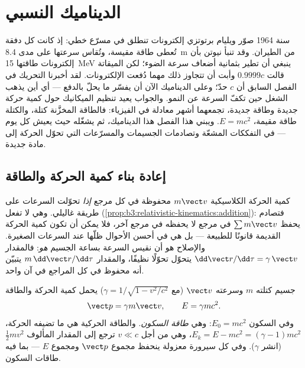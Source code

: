 \chapter{الديناميك النسبي}\label{ch:b3:relativistic-dynamics}

سنة 1964 صوّر ويليام برتوتزي إلكترونات تنطلق في مسرّع خطي: إذ
كانت كل دفقة تُعطى طاقة مقيسة، وتُقاس سرعتها على مدى \qty{8.4}{m}
من الطيران. وقد تنبأ نيوتن بأن إلكترونات طاقتها \qty{15}{MeV}
ينبغي أن تطير بثمانية أضعاف سرعة الضوء؛ لكن الميقاتة قالت
$0.9999c$ وأبت أن تتجاوز ذلك مهما دُفعت الإلكترونات. لقد أخبرنا
التحريك في الفصل السابق أن $c$ حدّ؛ وعلى الديناميك الآن أن يفسّر
ما يحلّ بالدفع --- أي أين يذهب الشغل حين تكفّ السرعة عن النمو.
والجواب يعيد تنظيم الميكانيك حول كمية حركة جديدة وطاقة جديدة،
تجمعهما أشهر معادلة في الفيزياء: فالطاقة المخزَّنة كتلة، والكتلة
طاقة مقيمة، $E = mc^2$. ويبني هذا الفصل هذا الديناميك، ثم يشغّله
حيث يعيش كل يوم --- في التفككات المشعّة وتصادمات الجسيمات
والمسرّعات التي تحوّل الحركة إلى مادة جديدة.

\section{إعادة بناء كمية الحركة والطاقة}

\begin{remark}\label{rem:b3:relativistic-dynamics:why}
كمية الحركة الكلاسيكية $m\vect v$ محفوظة في كل مرجع \emph{إذا}
تحوّلت السرعات على طريقة غاليلي. وهي لا تفعل
(\cref{prop:b3:relativistic-kinematics:addition}): فتصادم يحفظ
$\sum m\vect v$ في مرجع لا يحفظه في مرجع آخر، فلا يمكن أن تكون
كمية الحركة القديمة قانونًا للطبيعة --- بل هي في أحسن الأحوال
ظلّها عند السرعات الصغيرة. والإصلاح هو أن نقيس السرعة بساعة
الجسيم \emph{هو}: فالمقدار $\dd\vect r/\dd\tau =
\gamma\,\vect v$ يتحوّل تحوّلًا نظيفًا، والمقدار $m\,\dd\vect r/\dd\tau$
يتبيّن أنه محفوظ في كل المراجع في آن واحد.
\end{remark}

\begin{definition}\label{def:b3:relativistic-dynamics:momentum-energy}
جسيم كتلته $m$ وسرعته $\vect v$ (مع $\gamma = 1/\sqrt{1 -
v^2/c^2}$) يحمل كمية الحركة والطاقة
\[
\vect p = \gamma m\vect v , \qquad
E = \gamma mc^2 .
\]
وفي السكون $E_0 = mc^2$: وهي \emph{طاقة السكون}. والطاقة الحركية
هي ما تضيفه الحركة، $E_k = E - mc^2 = (\gamma - 1)mc^2$، وهي من أجل $v
\ll c$ ترجع إلى المقدار المألوف $\tfrac12 mv^2$ (انشر $\gamma$).
وفي كل سيرورة معزولة ينحفظ مجموع $\vect p$ ومجموع $E$ --- بما
فيه طاقات السكون.
\end{definition}

